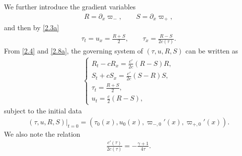 \documentclass[11pt,reqno]{article}
\newcommand{\dps}{\displaystyle}
\newcommand{\fr}{\frac}
\newcommand{\pa}{\partial}
\numberwithin{equation}{section}
\begin{document}
We further introduce the gradient variables
\begin{align}\label{2.8}
R=\pa_x \varpi_-,\qquad S=\pa_x \varpi_+,
\end{align}
and then by \eqref{2.3a}
\begin{align}\label{2.8a}
\tau_t=u_x=\fr{R+S}{2},\qquad \tau_x=\fr{R-S}{2c(\tau)}.
\end{align}
From \eqref{2.4} and \eqref{2.8a}, the governing system of $(\tau, u, R, S)$ can be written as
\begin{align}\label{2.9}
\left\{
\begin{array}{l}
\dps R_t-cR_x=\fr{c'}{2c}(R-S)R, \\[8pt]
\dps S_t+cS_x=\fr{c'}{2c}(S-R)S, \\[8pt]
\dps \tau_t=\fr{R+S}{2}, \\[8pt]
\dps u_t=\fr{c}{2}(R-S),
\end{array}
\right.
\end{align}
subject to the initial data
\begin{align}\label{2.9a}
(\tau, u, R, S)|_{t=0}=(\tau_0(x), u_0(x), \varpi_{-,0}'(x), \varpi_{+,0}'(x)).
\end{align}
We also note the relation
\begin{align}\label{2.10}
\fr{c'(\tau)}{2c(\tau)}=-\fr{\gamma+1}{4\tau}.
\end{align}
\end{document}
